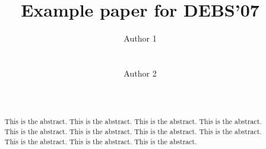 \documentclass{sig-alternate}
\begin{document}
%
%
%

\title{Example paper for DEBS'07}

%

%

\author{
\alignauthor Author 1\\
       \\
       \\
\alignauthor Author 2\\
       \\
       \\
%
}

\maketitle

\begin{abstract}
%
This is the abstract.  This is the abstract.  This is the abstract.  This is
the abstract.  This is the abstract.  This is the abstract.  This is the
abstract.  This is the abstract.  This is the abstract.  This is the abstract.
This is the abstract. 
%
\end{abstract}
\end{document}
